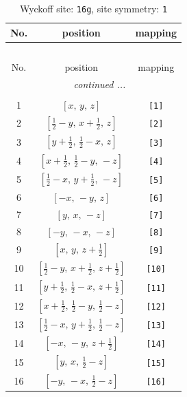 \documentclass[fleqn,8pt]{jsarticle}
\begin{document}
\begin{longtable}{ccc}
\caption{Wyckoff site: {\tt 16g}, site symmetry: {\tt 1}}
 \\
 \hline \hline
No. & position & mapping \\ \hline \endfirsthead

\multicolumn{2}{l}{\tablename\ \thetable{}} \\
 \hline \hline
No. & position & mapping \\ \hline \endhead

 \hline \hline
\multicolumn{2}{r}{\footnotesize\it continued ...} \\ \endfoot

 \hline \hline
\multicolumn{2}{r}{} \\ \endlastfoot

1 & $\left[ x,\, y,\, z \right]$ & {\tt [1]} \\ \hline
2 & $\left[ \frac{1}{2} - y,\, x + \frac{1}{2},\, z \right]$ & {\tt [2]} \\ \hline
3 & $\left[ y + \frac{1}{2},\, \frac{1}{2} - x,\, z \right]$ & {\tt [3]} \\ \hline
4 & $\left[ x + \frac{1}{2},\, \frac{1}{2} - y,\, - z \right]$ & {\tt [4]} \\ \hline
5 & $\left[ \frac{1}{2} - x,\, y + \frac{1}{2},\, - z \right]$ & {\tt [5]} \\ \hline
6 & $\left[ - x,\, - y,\, z \right]$ & {\tt [6]} \\ \hline
7 & $\left[ y,\, x,\, - z \right]$ & {\tt [7]} \\ \hline
8 & $\left[ - y,\, - x,\, - z \right]$ & {\tt [8]} \\ \hline
9 & $\left[ x,\, y,\, z + \frac{1}{2} \right]$ & {\tt [9]} \\ \hline
10 & $\left[ \frac{1}{2} - y,\, x + \frac{1}{2},\, z + \frac{1}{2} \right]$ & {\tt [10]} \\ \hline
11 & $\left[ y + \frac{1}{2},\, \frac{1}{2} - x,\, z + \frac{1}{2} \right]$ & {\tt [11]} \\ \hline
12 & $\left[ x + \frac{1}{2},\, \frac{1}{2} - y,\, \frac{1}{2} - z \right]$ & {\tt [12]} \\ \hline
13 & $\left[ \frac{1}{2} - x,\, y + \frac{1}{2},\, \frac{1}{2} - z \right]$ & {\tt [13]} \\ \hline
14 & $\left[ - x,\, - y,\, z + \frac{1}{2} \right]$ & {\tt [14]} \\ \hline
15 & $\left[ y,\, x,\, \frac{1}{2} - z \right]$ & {\tt [15]} \\ \hline
16 & $\left[ - y,\, - x,\, \frac{1}{2} - z \right]$ & {\tt [16]} \\
\end{longtable}
\end{document}
